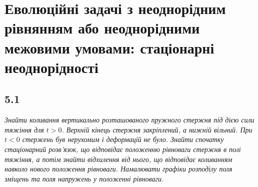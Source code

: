 \documentclass[a4paper, 14pt]{extreport}
\begin{document}
\chapter{Еволюційні задачі з неоднорідним рівнянням або неоднорідними межовими умовами: стаціонарні неоднорідності}

\section[Задача №5.1]{5.1}

\textit{Знайти коливання вертикально розташованого пружного стержня під дією сили тяжіння для $t > 0$. Верхній кінець стержня закріплений, а нижній вільний. При $t < 0$ стержень був нерухомим і деформацій не було. Знайти спочатку стаціонарний розв’язок, що відповідає положенню рівноваги стержня в полі тяжіння, а потім знайти відхилення від нього, що відповідає коливанням навколо нового положення рівноваги. Намалювати графіки розподілу поля зміщень та поля напружень у положенні рівноваги.}
\end{document}
